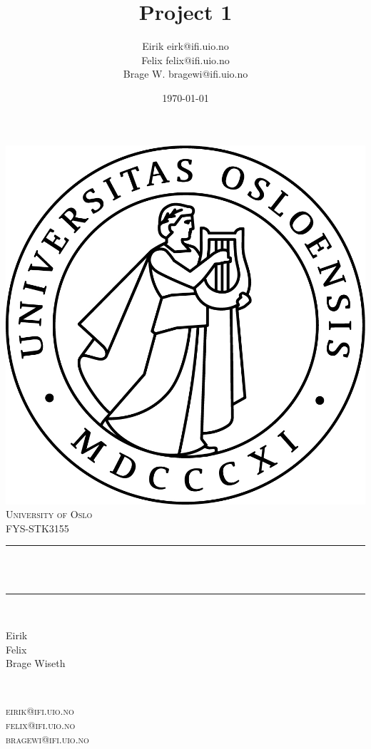 \documentclass[twoside,11pt]{report}
\title{{\huge Project 1}}
\author{\name Eirik \email eirk@ifi.uio.no \\
       \name Felix  \email felix@ifi.uio.no \\
       \name Brage W. \email bragewi@ifi.uio.no}
\date{\today}											%
\begin{document}

\begin{titlepage}
	\centering
    \vspace*{0.5 cm}
    \includegraphics[scale = 0.75]{uio.jpg}\\[1.0 cm]	%
    \textsc{\LARGE University of Oslo}\\[2.0 cm]	%
	\textsc{\Large FYS-STK3155}\\[0.5 cm]				%
	\rule{\linewidth}{0.2 mm} \\[0.4 cm]
	{ \huge \bfseries \@title}\\
	\rule{\linewidth}{0.2 mm} \\[1.5 cm]

	\begin{minipage}{0.4\textwidth}
		\begin{flushleft} \normalsize
			Eirik\\
            Felix\\
            Brage Wiseth\\
			\end{flushleft}
			\end{minipage}~
			\begin{minipage}{0.4\textwidth}
			\begin{flushright} \normalsize
        \textsc{
			    eirik@ifi.uio.no\\
          felix@ifi.uio.no\\
          bragewi@ifi.uio.no\\
        }
		\end{flushright}
        

\end{minipage}
\end{titlepage}
\end{document}

